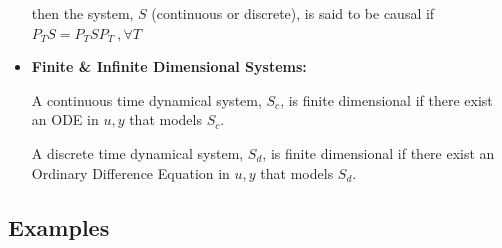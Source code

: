 \documentclass[twoside]{article}
\begin{document}
\begin{itemize}
then the system, $S$ (continuous or discrete), is said to be causal if
$P_T S = P_T S P_T \ , \forall T$

\vspace{12pt}

\item \textbf{Finite \& Infinite Dimensional Systems:}

\vspace{6pt}

A continuous time dynamical system, $S_c$, is finite dimensional 
if there exist an ODE in $u,y$ that models $S_c$.

\vspace{6pt}

A discrete time dynamical system, $S_d$, is finite dimensional 
if there exist an Ordinary Difference Equation in $u,y$ that models $S_d$.

\end{itemize}

\subsection{Examples}
\end{document}
